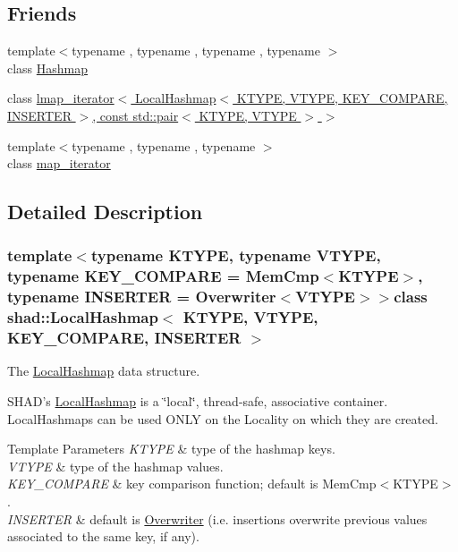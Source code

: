 \subsection*{Friends}
\begin{DoxyCompactItemize}
\item 
{\footnotesize template$<$typename , typename , typename , typename $>$ }\\class \hyperlink{classshad_1_1LocalHashmap_a14c7f14e3d86371810686e384b53cbb6}{Hashmap}
\item 
class \hyperlink{classshad_1_1LocalHashmap_a409d20941abf9e3ce2b3f49f749fe1f7}{lmap\-\_\-iterator$<$ Local\-Hashmap$<$ K\-T\-Y\-P\-E, V\-T\-Y\-P\-E, K\-E\-Y\-\_\-\-C\-O\-M\-P\-A\-R\-E, I\-N\-S\-E\-R\-T\-E\-R $>$, const std\-::pair$<$ K\-T\-Y\-P\-E, V\-T\-Y\-P\-E $>$ $>$}
\item 
{\footnotesize template$<$typename , typename , typename $>$ }\\class \hyperlink{classshad_1_1LocalHashmap_ae4a075e5a8191685a74f2d18b8cd8850}{map\-\_\-iterator}
\end{DoxyCompactItemize}


\subsection{Detailed Description}
\subsubsection*{template$<$typename K\-T\-Y\-P\-E, typename V\-T\-Y\-P\-E, typename K\-E\-Y\-\_\-\-C\-O\-M\-P\-A\-R\-E = Mem\-Cmp$<$\-K\-T\-Y\-P\-E$>$, typename I\-N\-S\-E\-R\-T\-E\-R = Overwriter$<$\-V\-T\-Y\-P\-E$>$$>$class shad\-::\-Local\-Hashmap$<$ K\-T\-Y\-P\-E, V\-T\-Y\-P\-E, K\-E\-Y\-\_\-\-C\-O\-M\-P\-A\-R\-E, I\-N\-S\-E\-R\-T\-E\-R $>$}

The \hyperlink{classshad_1_1LocalHashmap}{Local\-Hashmap} data structure. 

S\-H\-A\-D's \hyperlink{classshad_1_1LocalHashmap}{Local\-Hashmap} is a \char`\"{}local\char`\"{}, thread-\/safe, associative container. Local\-Hashmaps can be used O\-N\-L\-Y on the Locality on which they are created. 
\begin{DoxyTemplParams}{Template Parameters}
{\em K\-T\-Y\-P\-E} & type of the hashmap keys. \\
\hline
{\em V\-T\-Y\-P\-E} & type of the hashmap values. \\
\hline
{\em K\-E\-Y\-\_\-\-C\-O\-M\-P\-A\-R\-E} & key comparison function; default is Mem\-Cmp$<$\-K\-T\-Y\-P\-E$>$. \\
\hline
{\em I\-N\-S\-E\-R\-T\-E\-R} & default is \hyperlink{structshad_1_1Overwriter}{Overwriter} (i.\-e. insertions overwrite previous values associated to the same key, if any). \\
\hline
\end{DoxyTemplParams}


